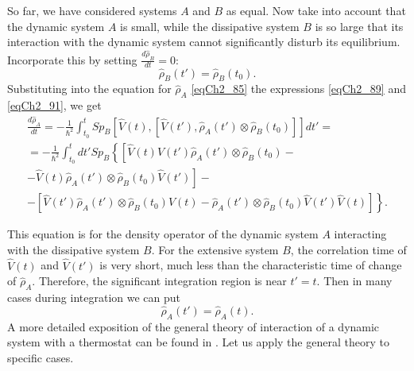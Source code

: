 So far, we have considered systems $A$ and $B$ as equal. Now take into account that the dynamic system $A$ is small, while the dissipative system $B$ is so large that its interaction with the dynamic system cannot significantly disturb its equilibrium. Incorporate this by setting $\frac{d \hat{\rho}_B}{d t} = 0$: 
\begin{equation}
\hat{\rho}_B\left(t'\right) =
\hat{\rho}_B\left(t_0\right).
\label{eqCh2_92}
\end{equation}
Substituting into the equation for $\hat{\rho}_A$ \eqref{eqCh2_85} the expressions \eqref{eqCh2_89} and \eqref{eqCh2_91}, we get 
\begin{eqnarray}
\frac{d \hat{\rho}_A}{d t} = - \frac{1}{\hbar^2}
\int_{t_0}^t Sp_B\left[
\hat{V}\left(t\right),
\left[
\hat{V}\left(t'\right),
\hat{\rho}_A\left(t'\right) \otimes
\hat{\rho}_B\left(t_0\right)
\right]
\right]dt' = 
\nonumber \\ 
=
- \frac{1}{\hbar^2}
\int_{t_0}^t d t' Sp_B\left\{
\left[
\hat{V}\left(t\right)
\hat{V}\left(t'\right)
\hat{\rho}_A\left(t'\right) \otimes
\hat{\rho}_B\left(t_0\right) -
\right.
\right.
\nonumber \\
-
\left.
\left.
\hat{V}\left(t\right)
\hat{\rho}_A\left(t'\right) \otimes
\hat{\rho}_B\left(t_0\right)
\hat{V}\left(t'\right)
\right] - 
\right.
\nonumber \\
-
\left.
\left[
\hat{V}\left(t'\right)
\hat{\rho}_A\left(t'\right) \otimes
\hat{\rho}_B\left(t_0\right)
\hat{V}\left(t\right)
-
\hat{\rho}_A\left(t'\right) \otimes
\hat{\rho}_B\left(t_0\right)
\hat{V}\left(t'\right)\hat{V}\left(t\right) 
\right]
\right\}.
\label{eqCh2_93}
\end{eqnarray}

This equation is for the density operator of the dynamic system $A$ interacting with the dissipative system $B$. For the extensive system $B$, the correlation time of $\hat{V}\left(t\right)$ and $\hat{V}\left(t'\right)$ is very short, much less than the characteristic time of change of $\hat{\rho}_A$. Therefore, the significant integration region is near $t' = t$. Then in many cases during integration we can put
\[
\hat{\rho}_A\left(t'\right) =
\hat{\rho}_A\left(t\right).
\]
A more detailed exposition of the general theory of interaction of a dynamic system with a thermostat can be found in \cite{bLaks1974}. Let us apply the general theory to specific cases.  
 
